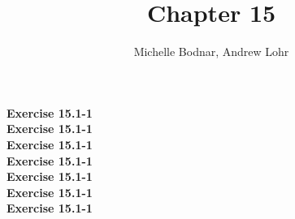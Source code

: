 \documentclass{article}
\title{Chapter 15}
\author{Michelle Bodnar, Andrew Lohr}
\begin{document}
\maketitle

\noindent\textbf{Exercise 15.1-1}\\

\noindent\textbf{Exercise 15.1-1}\\

\noindent\textbf{Exercise 15.1-1}\\

\noindent\textbf{Exercise 15.1-1}\\

\noindent\textbf{Exercise 15.1-1}\\

\noindent\textbf{Exercise 15.1-1}\\

\noindent\textbf{Exercise 15.1-1}\\
\end{document}
